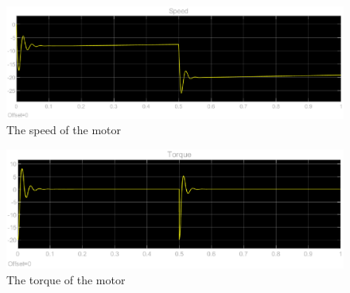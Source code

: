 \begin{figure}[H]
	\centering
	\includegraphics[width=0.7\linewidth]{pictures/control/speed.eps}
	\caption{The speed of the motor}
	\label{fig:speed}
\end{figure}

\begin{figure}[H]
	\centering
	\includegraphics[width=0.7\linewidth]{pictures/control/torque.eps}
	\caption{The torque of the motor}
	\label{fig:torque}
\end{figure}

